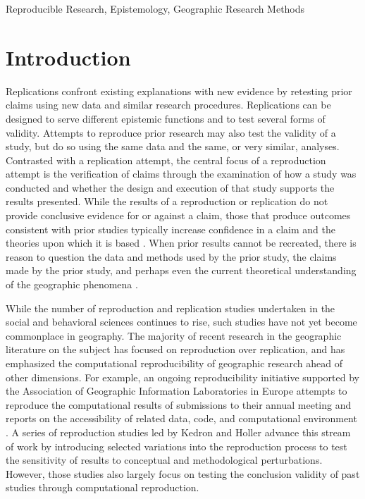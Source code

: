 \documentclass[]{interact}
\theoremstyle{plain}%
\theoremstyle{definition}
\theoremstyle{remark}
\begin{document}
\begin{keywords}
Reproducible Research, Epistemology, Geographic Research Methods
\end{keywords}

\newpage
\section*{Introduction}
Replications confront existing explanations with new evidence by retesting prior claims using new data and similar research procedures.
Replications can be designed to serve different epistemic functions and to test several forms of validity.
Attempts to reproduce prior research may also test the validity of a study, but do so using the same data and the same, or very similar, analyses. 
Contrasted with a replication attempt, the central focus of a reproduction attempt is the verification of claims through the examination of how a study was conducted and whether the design and execution of that study supports the results presented.
While the results of a reproduction or replication do not provide conclusive evidence for or against a claim, those that produce outcomes consistent with prior studies typically increase confidence in a claim and the theories upon which it is based \citep{earp2015, nichols2021}. 
When prior results cannot be recreated, there is reason to question the data and methods used by the prior study, the claims made by the prior study, and perhaps even the current theoretical understanding of the geographic phenomena \citep{christensen2019, NASEM2019}.

While the number of reproduction and replication studies undertaken in the social and behavioral sciences continues to rise, such studies have not yet become commonplace in geography.
The majority of recent research in the geographic literature on the subject has focused on reproduction over replication, and has emphasized the computational reproducibility of geographic research ahead of other dimensions.
For example, an ongoing reproducibility initiative supported by the Association of Geographic Information Laboratories in Europe attempts to reproduce the computational results of submissions to their annual meeting and reports on the accessibility of related data, code, and computational environment \citep{nust2018, ostermann2021}.
A series of reproduction studies led by Kedron and Holler \citep{Kedron2023Beyond, Kedron_Holler_Bardin_Hilgendorf_2022} advance this stream of work by introducing selected variations into the reproduction process to test the sensitivity of results to conceptual and methodological perturbations. 
However, those studies also largely focus on testing the conclusion validity of past studies through computational reproduction. 
\end{document}
